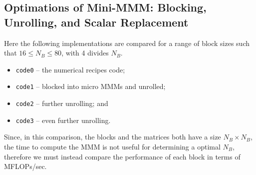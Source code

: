 \documentclass{article}
\begin{document}
\subsection{Optimations of Mini-MMM: Blocking, Unrolling, and Scalar Replacement}
Here the following implementations are compared for a range of block sizes such that $16\leq N_{B}\leq 80$, with 4 divides $N_{B}$.
\begin{itemize}
    \item \texttt{code0} -- the numerical recipes code;
    \item \texttt{code1} -- blocked into micro MMMs and unrolled;
    \item \texttt{code2} -- further unrolling; and
    \item \texttt{code3} -- even further unrolling.
\end{itemize}    

Since, in this comparison, the blocks and the matrices both have a size $N_{B}\times{N_{B}}$, the time to compute the MMM is not useful for determining a optimal $N_{B}$, therefore we must instead compare the performance of each block in terms of MFLOPs/sec.\\
\end{document}
